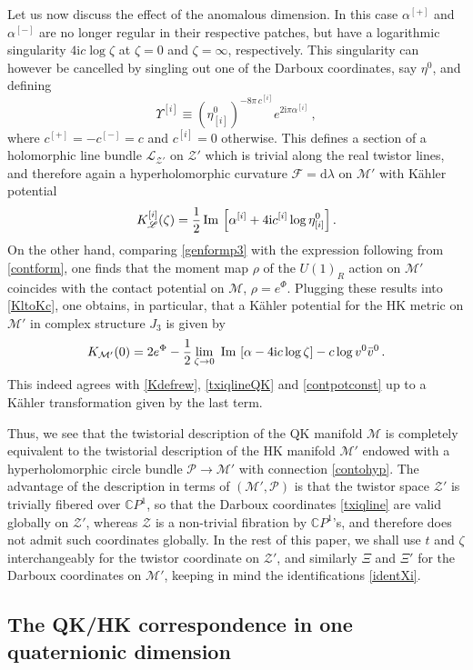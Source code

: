 \documentclass[12pt,reqno]{article}
\numberwithin{equation}{section}
\renewcommand{\Im}{\imag}
\DeclareMathOperator{\imag}{Im}
\newcommand{\be}{\begin{equation}}
\newcommand{\ee}{\end{equation}}
\def\Im{\,{\rm Im}\, }
\def\[{\left[}
\def\]{\right]}
\def\hf{\frac{1}{2}}
\def\bv{\bar v}
\newcommand{\CP}{\IC P^1}
\newcommand{\de}{\mathrm{d}}
\newcommand{\I}{\mathrm{i}}
\newcommand{\cM}{\mathcal{M}}
\newcommand{\cP}{\mathcal{P}}
\newcommand{\cZ}{\mathcal{Z}}
\newcommand{\IC}{\mathbb{C}}
\newcommand{\fb}{\mathscr{F}}
\newcommand{\lb}{\mathscr{L}}
\def\etai#1{\eta_{[#1]}}
\def\ai#1{{\alpha}^{[#1]}}
\def\ui#1{^{[#1]}}
\newcommand{\kahler}{{K\"ahler}\xspace}
\def\varpiqk{t}
\def\varpihk{\zeta}
\def\pcM{\cM'}
\def\pcZ{\cZ'}
\def\pXi{\Xi'}
\numberwithin{equation}{section}
\begin{document}
Let us now discuss the effect of the anomalous dimension. In this case $\ai{+}$ and
$\ai{-}$ are no longer regular in their respective patches, but have a logarithmic
singularity $4\I c\log\varpihk$ at $\varpihk=0$ and $\varpihk=\infty$, respectively.
This singularity can however be cancelled by singling out one of the Darboux
coordinates, say $\eta^0$, and defining
\be
\label{identW}
\Upsilon\ui{i}\equiv (\etai{i}^0)^{-8\pi \, c\ui{i}} e^{2\I\pi\ai{i}}\, ,
\ee
where $c\ui{+}=-c\ui{-}=c$ and $c\ui{i}=0$ otherwise.
This defines a section of a holomorphic line bundle $\lb_{\pcZ}$ on $\pcZ$
which is trivial along the real twistor lines, and therefore again
a hyperholomorphic curvature $\fb=\de\lambda$ on $\pcM$
with \kahler potential
\be
K\ui{i}_{\lb}(\varpihk)= \hf \Im \left[ \ai{i} + 4 \I  c\ui{i} \log \etai{i}^0\right] .
\ee
On the other hand, comparing \eqref{genformp3} with the expression following from \eqref{contform},
one finds that the moment map $\rho$ of the $U(1)_R$ action on $\pcM$
 coincides with the contact potential on $\cM$, $\rho=e^\Phi$.
Plugging these results into \eqref{KltoKc}, one obtains, in particular, that a \kahler
potential for the HK metric on $\pcM$ in complex structure $J_3$ is given by
\be
K_{\pcM}(0)=2 e^\Phi-\hf\lim\limits_{\varpihk\to0} \, \Im \[\alpha-4\I c\log\varpihk\]
-c  \log v^0\bv^0 \, .
\label{relpottt}
\ee
This indeed agrees with \eqref{Kdefrew}, \eqref{txiqlineQK} and \eqref{contpotconst}
up to a K\"ahler transformation given by the last term.



Thus, we see that the twistorial description of the QK manifold $\cM$
is completely equivalent to the twistorial description of the HK manifold $\pcM$ endowed
with a  hyperholomorphic circle bundle $\cP\rightarrow\pcM$ with connection \eqref{contohyp}.
The advantage of the
description in terms of $(\pcM,\cP)$ is that the twistor space $\pcZ$
is trivially fibered over $\CP$, so that the Darboux coordinates \eqref{txiqline} are valid
globally on $\pcZ$, whereas $\cZ$ is a non-trivial fibration by $\CP$'s, and therefore
does not admit such coordinates  globally.
In the rest of this paper, we shall use $\varpiqk$ and $\varpihk$
interchangeably for the twistor coordinate on $\pcZ$, and  similarly $\Xi$ and $\pXi$ for the
Darboux coordinates on $\pcM$, keeping in mind the identifications \eqref{identXi}.




\subsection{The QK/HK correspondence in one quaternionic dimension}
\label{oneQKdimension}
\end{document}
